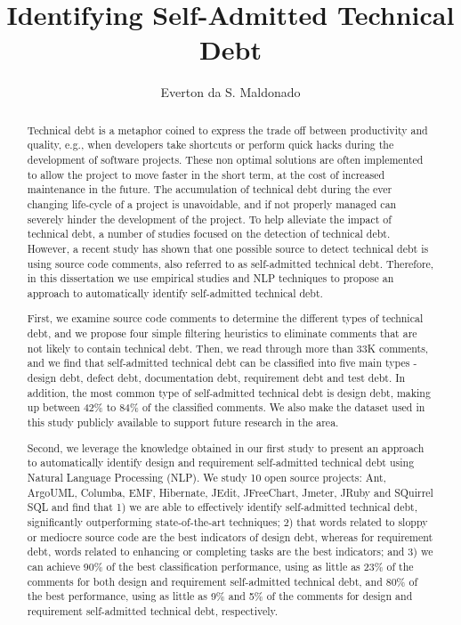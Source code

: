 \documentclass[12pt]{report}
\author{Everton da S. Maldonado}
\title {Identifying Self-Admitted Technical Debt}
\newcommand{\SATD}{self-admitted technical debt\xspace}
\begin{document}
\begin{abstract}

Technical debt is a metaphor coined to express the trade off between productivity and quality, e.g., when developers take shortcuts or perform quick hacks during the development of software projects. These non optimal solutions are often implemented to allow the project to move faster in the short term, at the cost of increased maintenance in the future. The accumulation of technical debt during the ever changing life-cycle of a project is unavoidable, and if not properly managed can severely hinder the development of the project. To help alleviate the impact of technical debt, a number of studies focused on the detection of technical debt. However, a recent study has shown that one possible source to detect technical debt is using source code comments, also referred to as self-admitted technical debt. Therefore, in this dissertation we use empirical studies and NLP techniques to propose an approach to automatically identify \SATD. 

First, we examine source code comments to determine the different types of technical debt, and we propose four simple filtering heuristics to eliminate comments that are not likely to contain technical debt. Then, we read through more than 33K comments, and we find that self-admitted technical debt can be classified into five main types - design debt, defect debt, documentation debt, requirement debt and test debt. In addition, the  most common type of self-admitted technical debt is design debt, making up between 42\% to 84\% of the classified comments. We also make the dataset used in this study publicly available to support future research in the area. 

Second, we leverage the knowledge obtained in our first study to present an approach to automatically identify design and requirement self-admitted technical debt using Natural Language Processing (NLP). We study 10 open source projects: Ant, ArgoUML, Columba, EMF, Hibernate, JEdit, JFreeChart, Jmeter, JRuby and SQuirrel SQL and find that 1) we are able to effectively identify self-admitted technical debt, significantly outperforming state-of-the-art techniques; 2) that words related to sloppy or mediocre source code are the best indicators of design debt, whereas for requirement debt, words related to enhancing or completing tasks are the best indicators; and 3)  we can achieve 90\% of the best classification performance, using as little as 23\% of the comments for both design and requirement self-admitted technical debt, and 80\% of the best performance, using as little as 9\% and 5\% of the comments for design and requirement self-admitted technical debt, respectively.

\end{abstract}
\end{document}
